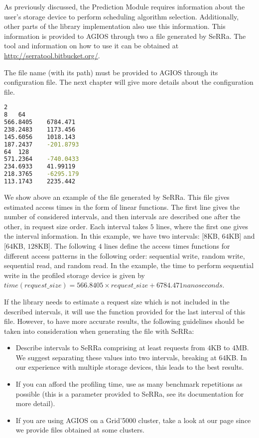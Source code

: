 As previously discussed, the Prediction Module requires information about the user's storage device to perform scheduling algorithm selection. Additionally, other parts of the library implementation also use this information. This information is provided to AGIOS through two a file generated by SeRRa. The tool and information on how to use it can be obtained at \url{http://serratool.bitbucket.org/}.

The file name (with its path) must be provided to AGIOS through its configuration file. The next chapter will give more details about the configuration file.

\begin{lstlisting}[language=bash]
2
8	64
566.8405	6784.471
238.2483	1173.456
145.6056	1018.143
187.2437	-201.8793
64	128
571.2364	-740.0433
234.6933	41.99119
218.3765	-6295.179
113.1743	2235.442
\end{lstlisting}

We show above an example of the file generated by SeRRa. This file gives estimated access times in the form of linear functions. The first line gives the number of considered intervals, and then intervals are described one after the other, in request size order. Each interval takes $5$ lines, where the first one gives the interval information. In this example, we have two intervals: [$8$KB, $64$KB] and [$64$KB, $128$KB]. The following $4$ lines define the access times functions for different access patterns in the following order: sequential write, random write, sequential read, and random read. In the example, the time to perform sequential write in the profiled storage device is given by \\
$time(request\_size) = 566.8405 \times request\_size + 6784.471 nanoseconds$.

If the library needs to estimate a request size which is not included in the described intervals, it will use the function provided for the last interval of this file. However, to have more accurate results, the following guidelines should be taken into consideration when generating the file with SeRRa:

\begin{itemize}
\item Describe intervals to SeRRa comprising at least requests from $4$KB to $4$MB. We suggest separating these values into two intervals, breaking at $64$KB. In our experience with multiple storage devices, this leads to the best results.
\item If you can afford the profiling time, use as many benchmark repetitions as possible (this is a parameter provided to SeRRa, see its documentation for more detail).
\item If you are using AGIOS on a Grid'5000 cluster, take a look at our page since we provide files obtained at some clusters.
\end{itemize}

